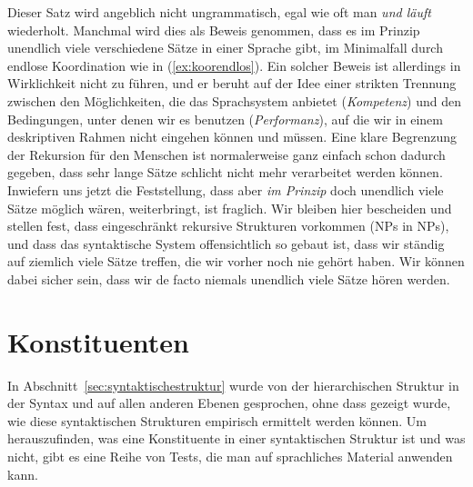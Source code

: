 \begin{exe}
\end{exe}

Dieser Satz wird angeblich nicht ungrammatisch, egal wie oft man \textit{und läuft} wiederholt.
Manchmal wird dies als Beweis genommen, dass es im Prinzip unendlich viele verschiedene Sätze in einer Sprache gibt, im Minimalfall durch endlose Koordination wie in (\ref{ex:koorendlos}).
Ein solcher Beweis ist allerdings in Wirklichkeit nicht zu führen, und er beruht auf der Idee einer strikten Trennung zwischen den Möglichkeiten, die das Sprachsystem anbietet (\textit{Kompetenz}) und den Bedingungen, unter denen wir es benutzen (\textit{Performanz}), auf die wir in einem deskriptiven Rahmen nicht eingehen können und müssen.
Eine klare Begrenzung der Rekursion für den Menschen ist normalerweise ganz einfach schon dadurch gegeben, dass sehr lange Sätze schlicht nicht mehr verarbeitet werden können.
Inwiefern uns jetzt die Feststellung, dass aber \textit{im Prinzip} doch unendlich viele Sätze möglich wären, weiterbringt, ist fraglich.
Wir bleiben hier bescheiden und stellen fest, dass eingeschränkt rekursive Strukturen vorkommen (\zB NPs in NPs), und dass das syntaktische System offensichtlich so gebaut ist, dass wir ständig auf ziemlich viele Sätze treffen, die wir vorher noch nie gehört haben.
Wir können dabei sicher sein, dass wir de facto niemals unendlich viele Sätze hören werden.

\section{Konstituenten}

\label{sec:satzglieder}


In Abschnitt~\ref{sec:syntaktischestruktur} wurde von der hierarchischen Struktur in der Syntax und auf allen anderen Ebenen gesprochen, ohne dass gezeigt wurde, wie diese syntaktischen Strukturen empirisch ermittelt werden können.
Um herauszufinden, was eine Konstituente in einer syntaktischen Struktur ist und was nicht, gibt es eine Reihe von Tests, die man auf sprachliches Material anwenden kann.

